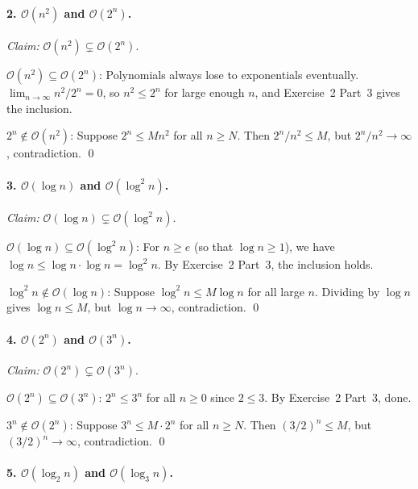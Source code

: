 \documentclass{article}
\theoremstyle{theorem}
\theoremstyle{definition}
\theoremstyle{remark}
\begin{document}
\paragraph{2. $\mathcal{O}(n^2)$ and $\mathcal{O}(2^n)$.}

\emph{Claim:} $\mathcal{O}(n^2) \subsetneq \mathcal{O}(2^n)$.

$\mathcal{O}(n^2) \subseteq \mathcal{O}(2^n)$: Polynomials always lose to exponentials eventually. $\lim_{n \to \infty} n^2 / 2^n = 0$, so $n^2 \leq 2^n$ for large enough $n$, and Exercise~2 Part~3 gives the inclusion.

$2^n \notin \mathcal{O}(n^2)$: Suppose $2^n \leq Mn^2$ for all $n \geq N$. Then $2^n / n^2 \leq M$, but $2^n / n^2 \to \infty$, contradiction. \qed

\paragraph{3. $\mathcal{O}(\log n)$ and $\mathcal{O}(\log^2 n)$.}

\emph{Claim:} $\mathcal{O}(\log n) \subsetneq \mathcal{O}(\log^2 n)$.

$\mathcal{O}(\log n) \subseteq \mathcal{O}(\log^2 n)$: For $n \geq e$ (so that $\log n \geq 1$), we have $\log n \leq \log n \cdot \log n = \log^2 n$. By Exercise~2 Part~3, the inclusion holds.

$\log^2 n \notin \mathcal{O}(\log n)$: Suppose $\log^2 n \leq M \log n$ for all large $n$. Dividing by $\log n$ gives $\log n \leq M$, but $\log n \to \infty$, contradiction. \qed

\paragraph{4. $\mathcal{O}(2^n)$ and $\mathcal{O}(3^n)$.}

\emph{Claim:} $\mathcal{O}(2^n) \subsetneq \mathcal{O}(3^n)$.

$\mathcal{O}(2^n) \subseteq \mathcal{O}(3^n)$: $2^n \leq 3^n$ for all $n \geq 0$ since $2 \leq 3$. By Exercise~2 Part~3, done.

$3^n \notin \mathcal{O}(2^n)$: Suppose $3^n \leq M \cdot 2^n$ for all $n \geq N$. Then $(3/2)^n \leq M$, but $(3/2)^n \to \infty$, contradiction. \qed

\paragraph{5. $\mathcal{O}(\log_2 n)$ and $\mathcal{O}(\log_3 n)$.}
\end{document}
